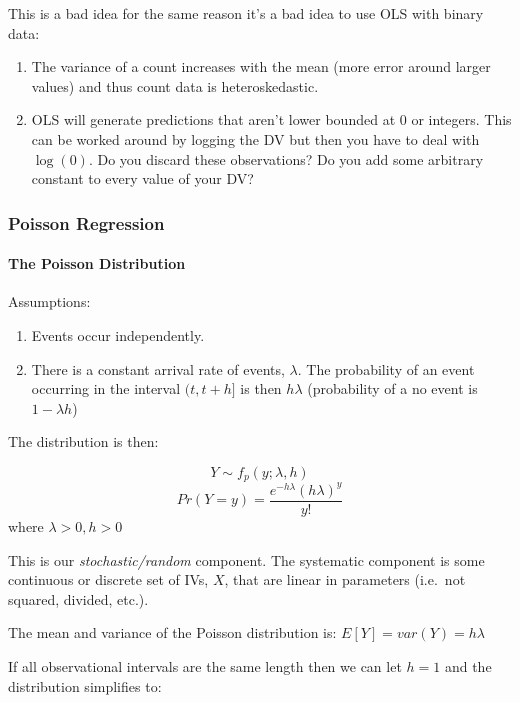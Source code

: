 \documentclass[
]{article}
\providecommand{\tightlist}{%
  \setlength{\itemsep}{0pt}\setlength{\parskip}{0pt}}
\begin{document}
This is a bad idea for the same reason it's a bad idea to use OLS with
binary data:

\begin{enumerate}
\def\labelenumi{\arabic{enumi}.}
\tightlist
\item
  The variance of a count increases with the mean (more error around
  larger values) and thus count data is heteroskedastic.
\item
  OLS will generate predictions that aren't lower bounded at 0 or
  integers. This can be worked around by logging the DV but then you
  have to deal with \(\log(0)\). Do you discard these observations? Do
  you add some arbitrary constant to every value of your DV?
\end{enumerate}

\hypertarget{poisson-regression}{%
\subsubsection{Poisson Regression}\label{poisson-regression}}

\hypertarget{the-poisson-distribution}{%
\paragraph{The Poisson Distribution}\label{the-poisson-distribution}}

Assumptions:

\begin{enumerate}
\def\labelenumi{\arabic{enumi}.}
\tightlist
\item
  Events occur independently.
\item
  There is a constant arrival rate of events, \(\lambda\). The
  probability of an event occurring in the interval \((t,t+h]\) is then
  \(h\lambda\) (probability of a no event is \(1-\lambda h\))
\end{enumerate}

The distribution is then:

\[Y\sim f_p(y;\lambda,h)\]
\[Pr(Y=y)=\frac{e^{-h\lambda}(h\lambda)^y}{y!}\] where
\(\lambda>0, h>0\)

This is our \emph{stochastic/random} component. The systematic component
is some continuous or discrete set of IVs, \(X\), that are linear in
parameters (i.e.~not squared, divided, etc.).

The mean and variance of the Poisson distribution is:
\(E[Y]=var(Y)=h\lambda\)

If all observational intervals are the same length then we can let
\(h=1\) and the distribution simplifies to:
\end{document}
